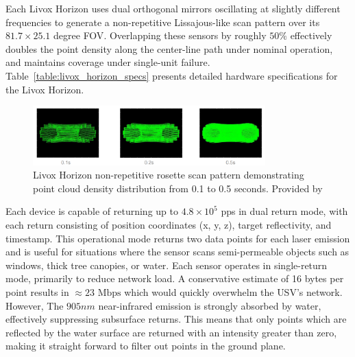 \documentclass{erauthesis}
\begin{document}
Each Livox Horizon uses dual orthogonal mirrors oscillating at slightly different frequencies to generate a non-repetitive Lissajous-like scan pattern over its $81.7 \times 25.1$ degree \ac{FOV}. 
Overlapping these sensors by roughly $50 \%$ effectively doubles the point density along the center-line path under nominal operation, and maintains coverage under single-unit failure.
Table~\ref{table:livox_horizon_specs} presents detailed hardware specifications for the Livox Horizon.



 
\begin{figure}[htbp]
\centering
\includegraphics[width=0.8\textwidth]{Images/Livox_1.png}
\caption{Livox Horizon non-repetitive rosette scan pattern demonstrating point cloud density distribution from 0.1 to 0.5 seconds. Provided by \cite{livox_manual}}
\label{fig:livox_scan_pattern}
\end{figure}


Each device is capable of returning up to $4.8 \times 10^5$ \ac{pps} in dual return mode, with each return consisting of position coordinates (x, y, z), target reflectivity, and timestamp.
This operational mode returns two data points for each laser emission and is useful for situations where the sensor scans semi-permeable objects such as windows, thick tree canopies, or water.
Each sensor operates in single-return mode, primarily to reduce network load.
A conservative estimate of 16 bytes per point results in $\approx 23 \text{ Mbps}$ which would quickly overwhelm the \ac{USV}'s network.
However, The $905 nm$ near-infrared emission is strongly absorbed by water, effectively suppressing subsurface returns.
This means that only points which are reflected by the water surface are returned with an intensity greater than zero, making it straight forward to filter out points in the ground plane.
\end{document}
